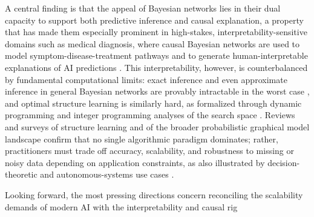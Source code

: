 A central finding is that the appeal of Bayesian networks lies in their dual capacity to support both predictive inference and causal explanation, a property that has made them especially prominent in high-stakes, interpretability-sensitive domains such as medical diagnosis, where causal Bayesian networks are used to model symptom-disease-treatment pathways and to generate human-interpretable explanations of AI predictions \cite{zhang2026causald,zhang2026explainable,zhang2026bayesian,amato2013artificial,butz2022investigating}. This interpretability, however, is counterbalanced by fundamental computational limits: exact inference and even approximate inference in general Bayesian networks are provably intractable in the worst case \cite{dagum1993approximating}, and optimal structure learning is similarly hard, as formalized through dynamic programming and integer programming analyses of the search space \cite{singh2018finding,cussens2017bayesian}. Reviews and surveys of structure learning and of the broader probabilistic graphical model landscape \cite{kitson2023survey,zhou2011structure,gao2026bayesian,revista2026network} confirm that no single algorithmic paradigm dominates; rather, practitioners must trade off accuracy, scalability, and robustness to missing or noisy data \cite{franzin2016bnstruct,mohan2013graphical} depending on application constraints, as also illustrated by decision-theoretic and autonomous-systems use cases \cite{abdallah2025advancing,zhang2026causalg,vargasserna2025neural}.

Looking forward, the most pressing directions concern reconciling the scalability demands of modern AI with the interpretability and causal rig





